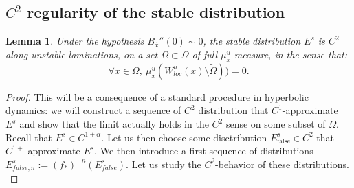 \documentclass[a4paper]{article}
\newtheorem{lemma}[theorem]{Lemma}
\theoremstyle{definition}
\begin{document}
\subsection{$C^2$ regularity of the stable distribution}

\begin{lemma}
    Under the hypothesis $B_{\widehat{x}}''(0) \sim 0$, the stable distribution $E^s$ is $C^2$ along unstable laminations, on a set $\tilde{\Omega} \subset \Omega$ of full $\mu_x^u$ measure, in the sense that:
    $$ \forall x \in \Omega, \ \mu_x^u( W^u_{loc}(x) \setminus \tilde{\Omega})  ) = 0. $$
\end{lemma} 


\begin{proof}
This will be a consequence of a standard procedure in hyperbolic dynamics: we will construct a sequence of $C^2$ distribution that $C^1$-approximate $E^s$ and show that the limit actually holds in the $C^2$ sense on some subset of $\Omega$. \\

Recall that $E^s \in C^{1+\alpha}$. Let us then choose some disctribution $E^s_{\text{false}} \in C^2$ that $C^{1+}$-approximate $E^s$. We then introduce a first sequence of distributions $ E^s_{false,n} := (f_*)^{-n}( E^s_{false}) $. Let us study the $C^2$-behavior of these distributions. \\


\end{proof}
\end{document}
